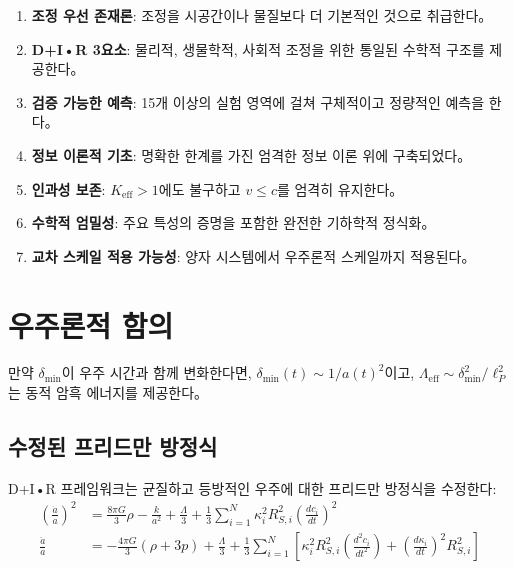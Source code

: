 \documentclass[11pt,a4paper]{article}
\begin{document}
\begin{enumerate}
\item \textbf{조정 우선 존재론}: 조정을 시공간이나 물질보다 더 기본적인 것으로 취급한다。

\item \textbf{D+I•R 3요소}: 물리적, 생물학적, 사회적 조정을 위한 통일된 수학적 구조를 제공한다。

\item \textbf{검증 가능한 예측}: 15개 이상의 실험 영역에 걸쳐 구체적이고 정량적인 예측을 한다。

\item \textbf{정보 이론적 기초}: 명확한 한계를 가진 엄격한 정보 이론 위에 구축되었다。

\item \textbf{인과성 보존}: $K_{\mathrm{eff}} > 1$에도 불구하고 $v \leq c$를 엄격히 유지한다。

\item \textbf{수학적 엄밀성}: 주요 특성의 증명을 포함한 완전한 기하학적 정식화。

\item \textbf{교차 스케일 적용 가능성}: 양자 시스템에서 우주론적 스케일까지 적용된다。
\end{enumerate}

\section{우주론적 함의}
만약 $\delta_{\min}$이 우주 시간과 함께 변화한다면, $\delta_{\min}(t) \sim 1/a(t)^2$이고, $\Lambda_{\text{eff}} \sim \delta_{\min}^2/\ell_P^2$는 동적 암흑 에너지를 제공한다。

\subsection{수정된 프리드만 방정식}

D+I•R 프레임워크는 균질하고 등방적인 우주에 대한 프리드만 방정식을 수정한다:
\begin{align}
\left(\frac{\dot{a}}{a}\right)^2 &= \frac{8\pi G}{3}\rho - \frac{k}{a^2} + \frac{\Lambda}{3} + \frac{1}{3}\sum_{i=1}^N \kappa_i^2 R_{S,i}^2 \left(\frac{dc_i}{dt}\right)^2 \\
\frac{\ddot{a}}{a} &= -\frac{4\pi G}{3}(\rho + 3p) + \frac{\Lambda}{3} + \frac{1}{3}\sum_{i=1}^N \left[ \kappa_i^2 R_{S,i}^2 \left(\frac{d^2c_i}{dt^2}\right) + \left(\frac{d\kappa_i}{dt}\right)^2 R_{S,i}^2 \right]
\end{align}
\end{document}
